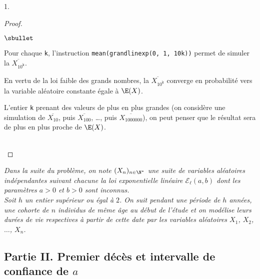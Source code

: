\begin{noliste}{1.}
\begin{proof}
\begin{noliste}{$\sbullet$}
    \item Pour chaque {\tt k}, l'instruction {\tt mean(grandlinexp(0,
        1, 10\puis{}k))} permet de simuler la \var
      $\overline{X_{10^{\mathtt{k}}}}$.

    \item En vertu de la loi faible des grands nombres, la \var
      $\overline{X_{10^{\mathtt{k}}}}$ converge en probabilité vers la
      variable aléatoire constante égale à $\E(X)$.

    \item L'entier {\tt k} prenant des valeurs de plus en plus grandes 
      (on
      considère une simulation de $\overline{X_{10}}$, puis
      $\overline{X_{100}}$, \ldots, puis $\overline{X_{1000000}}$), on
      peut penser que le résultat sera de plus en plus proche de
      $\E(X)$.
    \end{noliste}
    ~\\[-1cm]
  \end{proof}
\end{noliste}


\newpage


\noindent%
{\it Dans la suite du problème, on note $(X_n)_{n\in\N^*}$ une suite
  de variables aléatoires indépendantes suivant chacune la loi
  exponentielle linéaire $\mathcal{E}_\ell(a,b)$ dont les paramètres
  $a>0$ et $b>0$ sont inconnus.\\
  Soit $h$ un entier supérieur ou égal à $2$. On suit pendant une
  période de $h$ années, une \og cohorte \fg{} de $n$ individus de
  même âge au début de l'étude et on modélise leurs durées de vie
  respectives à partir de cette date par les variables aléatoires
  $X_1$, $X_2$, $\hdots$, $X_n$.}


\subsection*{Partie II. Premier décès et intervalle de confiance de $a$}

